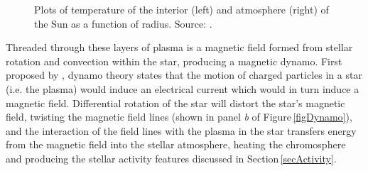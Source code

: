 \begin{figure}
    \captionsetup{width=.8\textwidth}
    \hspace{-1.5cm}
    \caption{Plots of temperature of the interior (left) and atmosphere (right) of the Sun as a function of radius. Source: \citet{2006Carroll}.}
    \label{figSunTemp}
\end{figure}

Threaded through these layers of plasma is a magnetic field formed from stellar rotation and convection within the star, producing a magnetic dynamo. First proposed by \citet{1961Babcock}, dynamo theory states that the motion of charged particles in a star (i.e. the plasma) would induce an electrical current which would in turn induce a magnetic field. Differential rotation of the star will distort the star's magnetic field, twisting the magnetic field lines (shown in panel \textit{b} of Figure\,\ref{figDynamo}), and the interaction of the field lines with the plasma in the star transfers energy from the magnetic field into the stellar atmosphere, heating the chromosphere and producing the stellar activity features discussed in Section\,\ref{secActivity}.\\

